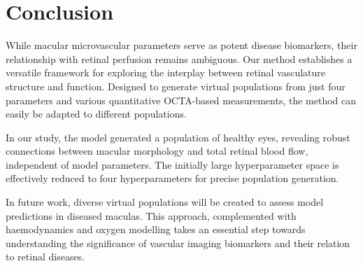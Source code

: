 \documentclass[11pt,]{article}
\newcommand{\supplementarysection}{%
  \setcounter{figure}{0}%
  \setcounter{table}{0}
  \let\oldthefigure\thefigure%
  \let\oldthetable\thetable
  \renewcommand{\thefigure}{S\oldthefigure}%
  \renewcommand{\thetable}{S\oldthetable}
  \section{Supplementary material}%
  \let\oldsection\section%
  \renewcommand{\section}{%
    \let\thefigure\oldthefigure%
    \let\section\oldsection%
    \oldsection%
  }
}
\begin{document}
\section{Conclusion}\label{sec:conclusion}

While macular microvascular parameters serve as potent disease biomarkers, their relationship with retinal perfusion remains ambiguous.
Our method establishes a versatile framework for exploring the interplay between retinal vasculature structure and function.
Designed to generate virtual populations from just four parameters and various quantitative OCTA-based measurements, the method can easily be adapted to different populations.

In our study, the model generated a population of healthy eyes, revealing robust connections between macular morphology and total retinal blood flow, independent of model parameters.
The initially large hyperparameter space is effectively reduced to four hyperparameters for precise population generation.

In future work, diverse virtual populations will be created to assess model predictions in diseased maculas.
This approach, complemented with haemodynamics and oxygen modelling takes an essential step towards understanding the significance of vascular imaging biomarkers and their relation to retinal diseases.




\end{document}
